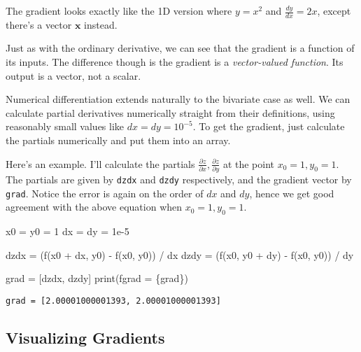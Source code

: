 \documentclass[
  letterpaper,
  DIV=11,
  numbers=noendperiod]{scrreprt}
\newenvironment{Shaded}{\begin{snugshade}}{\end{snugshade}}
\newcommand{\BuiltInTok}[1]{\textcolor[rgb]{0.00,0.23,0.31}{#1}}
\newcommand{\DecValTok}[1]{\textcolor[rgb]{0.68,0.00,0.00}{#1}}
\newcommand{\FloatTok}[1]{\textcolor[rgb]{0.68,0.00,0.00}{#1}}
\newcommand{\NormalTok}[1]{\textcolor[rgb]{0.00,0.23,0.31}{#1}}
\newcommand{\OperatorTok}[1]{\textcolor[rgb]{0.37,0.37,0.37}{#1}}
\newcommand{\SpecialCharTok}[1]{\textcolor[rgb]{0.37,0.37,0.37}{#1}}
\newcommand{\SpecialStringTok}[1]{\textcolor[rgb]{0.13,0.47,0.30}{#1}}
\begin{document}
The gradient looks exactly like the 1D version where \(y=x^2\) and
\(\frac{dy}{dx}=2x\), except there's a vector \(\mathbf{x}\) instead.

Just as with the ordinary derivative, we can see that the gradient is a
function of its inputs. The difference though is the gradient is a
\emph{vector-valued function}. Its output is a vector, not a scalar.

Numerical differentiation extends naturally to the bivariate case as
well. We can calculate partial derivatives numerically straight from
their definitions, using reasonably small values like \(dx=dy=10^{-5}\).
To get the gradient, just calculate the partials numerically and put
them into an array.

Here's an example. I'll calculate the partials
\(\frac{\partial z}{\partial x}, \frac{\partial z}{\partial y}\) at the
point \(x_0=1, y_0=1\). The partials are given by \texttt{dzdx} and
\texttt{dzdy} respectively, and the gradient vector by \texttt{grad}.
Notice the error is again on the order of \(dx\) and \(dy\), hence we
get good agreement with the above equation when \(x_0=1, y_0=1\).

\begin{Shaded}
\begin{Highlighting}[]
\NormalTok{x0 }\OperatorTok{=}\NormalTok{ y0 }\OperatorTok{=} \DecValTok{1}
\NormalTok{dx }\OperatorTok{=}\NormalTok{ dy }\OperatorTok{=} \FloatTok{1e{-}5}

\NormalTok{dzdx }\OperatorTok{=}\NormalTok{ (f(x0 }\OperatorTok{+}\NormalTok{ dx, y0) }\OperatorTok{{-}}\NormalTok{ f(x0, y0)) }\OperatorTok{/}\NormalTok{ dx}
\NormalTok{dzdy }\OperatorTok{=}\NormalTok{ (f(x0, y0 }\OperatorTok{+}\NormalTok{ dy) }\OperatorTok{{-}}\NormalTok{ f(x0, y0)) }\OperatorTok{/}\NormalTok{ dy}

\NormalTok{grad }\OperatorTok{=}\NormalTok{ [dzdx, dzdy]}
\BuiltInTok{print}\NormalTok{(}\SpecialStringTok{f\textquotesingle{}grad = }\SpecialCharTok{\{}\NormalTok{grad}\SpecialCharTok{\}}\SpecialStringTok{\textquotesingle{}}\NormalTok{)}
\end{Highlighting}
\end{Shaded}

\begin{verbatim}
grad = [2.00001000001393, 2.00001000001393]
\end{verbatim}

\hypertarget{visualizing-gradients}{%
\subsection{Visualizing Gradients}\label{visualizing-gradients}}
\end{document}
